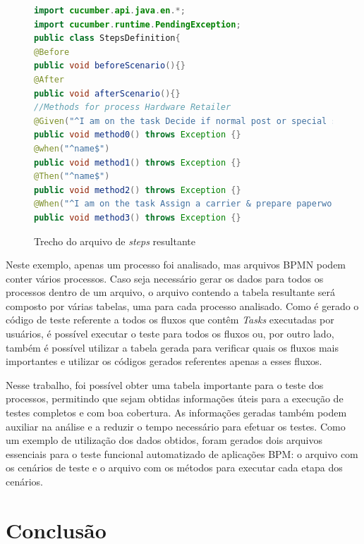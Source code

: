 \documentclass[12pt]{article}
\begin{document}
\begin{figure}[ht]
\centering
\begin{lstlisting}[language=Java,frame=single,basicstyle=\footnotesize\ttfamily]
import cucumber.api.java.en.*;
import cucumber.runtime.PendingException;
public class StepsDefinition{
@Before
public void beforeScenario(){}
@After
public void afterScenario(){} 
//Methods for process Hardware Retailer
@Given("^I am on the task Decide if normal post or special shipment$") 
public void method0() throws Exception {} 
@when("^name$") 
public void method1() throws Exception {} 
@Then("^name$") 
public void method2() throws Exception {} 
@When("^I am on the task Assign a carrier & prepare paperwork$") 
public void method3() throws Exception {} 
\end{lstlisting}
\caption{Trecho do arquivo de \emph{steps} resultante}
\label{fig:codigojava}
\end{figure}

Neste exemplo, apenas um processo foi analisado, mas arquivos BPMN podem conter vários processos. Caso seja necessário gerar os dados para todos os processos dentro de um arquivo, o arquivo contendo a tabela resultante será composto por várias tabelas, uma para cada processo analisado. Como é gerado o código de teste referente a todos os fluxos que contêm \emph{Tasks} executadas por usuários, é possível executar o teste para todos os fluxos ou, por outro lado, também é possível utilizar a tabela gerada para verificar quais os fluxos mais importantes e utilizar os códigos gerados referentes apenas a esses fluxos.

Nesse trabalho, foi possível obter uma tabela importante para o teste dos processos, permitindo que sejam obtidas informações úteis para a execução de testes completos e com boa cobertura. As informações geradas também podem auxiliar na análise e a reduzir o tempo necessário para efetuar os testes. Como um exemplo de utilização dos dados obtidos, foram gerados dois arquivos essenciais para o teste funcional automatizado de aplicações BPM: o arquivo com os cenários de teste e o arquivo com os métodos para executar cada etapa dos cenários. %




\section{Conclusão}\label{sec:conclusao}
\end{document}
